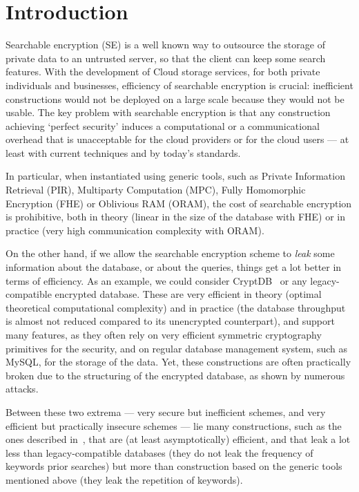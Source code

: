 

\section{Introduction} %
\label{sec:introduction}

Searchable encryption (SE) is a well known way to outsource the storage of private data to an untrusted server, so that the client can keep some search features.
With the development of Cloud storage services, for both private individuals and businesses, efficiency of searchable encryption is crucial: inefficient constructions would not be deployed on a large scale because they would not be usable.
The key problem with searchable encryption is that any construction achieving `perfect security' induces a computational or a communicational overhead that is unacceptable for the cloud providers or for the cloud users --- at least with current techniques and by today's standards.


In particular, when instantiated using generic tools, such as Private Information Retrieval (PIR), Multiparty Computation (MPC), Fully Homomorphic Encryption (FHE) or Oblivious RAM (ORAM), the cost of searchable encryption is prohibitive, both in theory (\eg linear in the size of the database with FHE) or in practice (very high communication complexity with ORAM).

On the other hand, if we allow the searchable encryption scheme to \emph{leak} some information about the database, or about the queries, things get a lot better in terms of efficiency.
As an example, we could consider CryptDB~\cite{SOSP:PRZB11} or any legacy-compatible encrypted database.
These are very efficient in theory (optimal theoretical computational complexity) and in practice (the database throughput is almost not reduced compared to its unencrypted counterpart), and support many features, as they often rely on very efficient symmetric cryptography primitives for the security, and on regular database management system, such as MySQL, for the storage of the data.
Yet, these constructions are often practically broken due to the structuring of the encrypted database, as shown by numerous attacks\cite{CCS:NavKamWri15,CCS:CGPR15,EPRINT:LacMinPat17}.

Between these two extrema --- very secure but inefficient schemes, and very efficient but practically insecure schemes --- lie many constructions, such as the ones described in~\cite{CCS:CGKO06,CCS:KamPapRoe12,C:CJJKRS13,NDSS:StePapShi14,CCS:Bost16,EC:KamMoa17,CCS:BosMinOhr17}, that are (at least asymptotically) efficient, and that leak a lot less than legacy-compatible databases (\eg they do not leak the frequency of keywords prior searches) but more than construction based on the generic tools mentioned above (\eg they leak the repetition of keywords).

